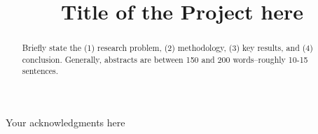 \documentclass{fast-nuces-bs}
\title{Title of the Project here}
\begin{document}
\begin{acknowledgements}
	Your acknowledgments here
\end{acknowledgements}

\begin{abstract}
Briefly state the (1) research problem, (2) methodology, (3) key results, and (4) conclusion. Generally, abstracts are between 150 and 200 words–roughly 10-15 sentences.
\end{abstract}














%


 
\end{document}
